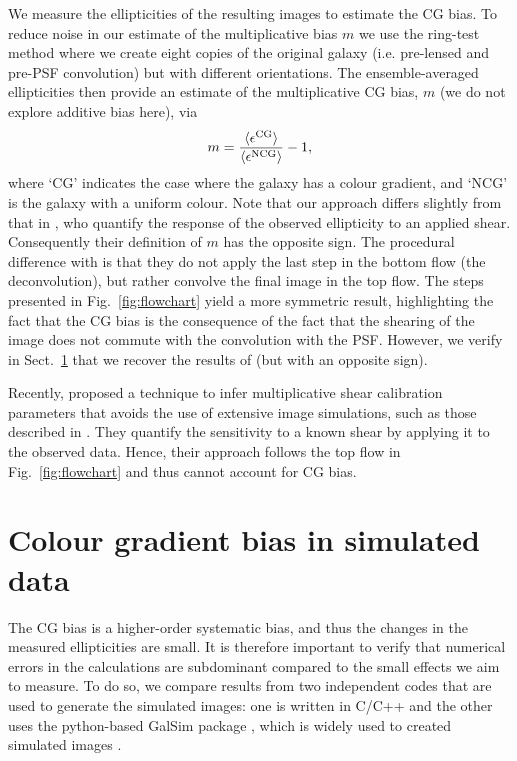 \documentclass[useAMS,usenatbib]{mnras}
\newcommand{\be}{\begin{equation}}
\newcommand{\ee}{\end{equation}}
\begin{document}
We measure the ellipticities of the resulting images to estimate the CG bias. To reduce noise in our estimate of the multiplicative bias $m$ we use the ring-test method \citep{Nakajima07} where we create eight copies of the original galaxy (i.e. pre-lensed and pre-PSF convolution) but with different orientations. The ensemble-averaged ellipticities then  provide an estimate of the multiplicative CG bias, $m$ (we do not explore additive bias here), via
%
\be
m= {\langle \epsilon^{\rm CG}\rangle \over \langle \epsilon^{\rm NCG}\rangle }-1,
\ee
%
where `CG' indicates the case where the galaxy has a colour gradient, and `NCG' is the galaxy
with a uniform colour. Note that our approach differs slightly from that in , who quantify the response of the observed ellipticity to an applied shear. Consequently their definition
of $m$ has the opposite sign. The procedural difference with  is that they do not apply the last step in the bottom flow (the deconvolution), but rather convolve the final image in the top flow.
The steps presented in Fig.~\ref{fig:flowchart} yield a more symmetric result, highlighting the fact
that the CG bias is the consequence of the fact that the shearing of the image does not commute
with the convolution with the PSF. However, we verify in Sect.~\ref{sec:simulations} that we recover
the results of  (but with an opposite sign).

Recently, \cite{Huff17} proposed a technique to infer multiplicative shear calibration parameters that avoids the use of extensive image simulations, such as those described in \citep{Hoekstra17}. They quantify the
sensitivity to a known shear by applying it to the observed data. Hence, their approach follows the top flow in Fig.~\ref{fig:flowchart} and thus cannot account for CG bias.

\section{Colour gradient bias in simulated data}
\label{sec:simulations}

The CG bias is a higher-order systematic bias, and thus the changes in the measured ellipticities are small. It is therefore important to verify that numerical errors in the calculations are subdominant compared to the small effects we aim to measure. To do so, we compare results from two independent codes that are used to generate the simulated images: one is written in C/C++ and the other uses the
python-based {\sc GalSim} package \citep{Rowe15}, which is widely used to created simulated images \citep[e.g.][]{FenechConti17, Hoekstra17,2017arXiv170801533Z}.
\end{document}
